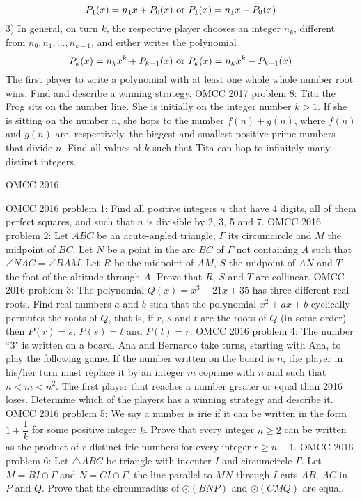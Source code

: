 \[ P_1(x)=n_1x+P_0(x) \textup{  or  } P_1(x)=n_1x-P_0(x) \]
3) In general, on turn $k$, the respective player chooses an integer $n_k$, different from $n_0, n_1, \ldots, n_{k-1}$, and either writes the polynomial
\[ P_k(x)=n_kx^k+P_{k-1}(x) \textup{  or  } P_k(x)=n_kx^k-P_{k-1}(x) \]
The first player to write a polynomial with at least one whole whole number root wins. Find and describe a winning strategy. 
OMCC 2017 problem 8:  Tita the Frog sits on the number line. She is initially on the integer number $k>1$. If she is sitting on the number $n$, she hops to the number $f(n)+g(n)$, where $f(n)$ and $g(n)$ are, respectively, the biggest and smallest positive prime numbers that divide $n$. Find all values of $k$ such that Tita can hop to infinitely many distinct integers. 

OMCC 2016 

OMCC 2016 problem 1:  Find all positive integers $n$ that have 4 digits, all of them perfect squares, and such that $n$ is divisible by 2, 3, 5 and 7. 
OMCC 2016 problem 2:  Let $ABC$ be an acute-angled triangle, $\Gamma$ its circumcircle and $M$ the midpoint of $BC$. Let $N$ be a point in the arc $BC$ of $\Gamma$ not containing $A$ such that $\angle NAC= \angle BAM$. Let $R$ be the midpoint of $AM$, $S$ the midpoint of $AN$ and $T$ the foot of the altitude through $A$. Prove that $R$, $S$ and $T$ are collinear. 
OMCC 2016 problem 3:  The polynomial $Q(x)=x^3-21x+35$ has three different real roots. Find real numbers $a$ and $b$ such that the polynomial $x^2+ax+b$ cyclically permutes the roots of $Q$, that is, if $r$, $s$ and $t$ are the roots of $Q$ (in some order) then $P(r)=s$, $P(s)=t$ and $P(t)=r$. 
OMCC 2016 problem 4:  The number ``3" is written on a board. Ana and Bernardo take turns, starting with Ana, to play the following game. If the number written on the board is $n$, the player in his/her turn must replace it by an integer $m$ coprime with $n$ and such that $n<m<n^2$. The first player that reaches a number greater or equal than 2016 loses. Determine which of the players has a winning strategy and describe it. 
OMCC 2016 problem 5:  We say a number is irie if it can be written in the form $1+\dfrac{1}{k}$ for some positive integer $k$. Prove that every integer $n \geq 2$ can be written as the product of $r$ distinct irie numbers for every integer $r \geq n-1$. 
OMCC 2016 problem 6:  Let $\triangle ABC$ be triangle with incenter $I$ and circumcircle $\Gamma$. Let $M=BI\cap \Gamma$ and $N=CI\cap \Gamma$, the line parallel to $MN$ through $I$ cuts $AB$, $AC$ in $P$ and $Q$. Prove that the circumradius of $\odot (BNP)$ and $\odot (CMQ)$ are equal. 

